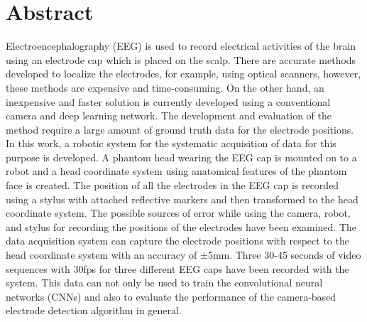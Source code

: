 \chapter{Abstract}
Electroencephalography (EEG) is used to record electrical activities of the brain using an electrode cap which is placed on the scalp. There are accurate methods developed to localize the electrodes, for example, using optical scanners, however, these methods are expensive and time-consuming. On the other hand, an inexpensive and faster solution is currently developed using a conventional camera and deep learning network. The development and evaluation of the method require a large amount of ground truth data for the electrode positions. In this work, a robotic system for the systematic acquisition of data for this purpose is developed. A phantom head wearing the EEG cap is mounted on to a robot and a head coordinate system using anatomical features of the phantom face is created. The position of all the electrodes in the EEG cap is recorded using a stylus with attached reflective markers and then transformed to the head coordinate system. The possible sources of error while using the camera, robot, and stylus for recording the positions of the electrodes have been examined. The data acquisition system can capture the electrode positions with respect to the head coordinate system with an accuracy of ±5mm. Three 30-45 seconds of video sequences with 30fps for three different EEG caps have been recorded with the system. This data can not only be used to train the convolutional neural networks (CNNs) and also to evaluate the performance of the camera-based electrode detection algorithm in general.